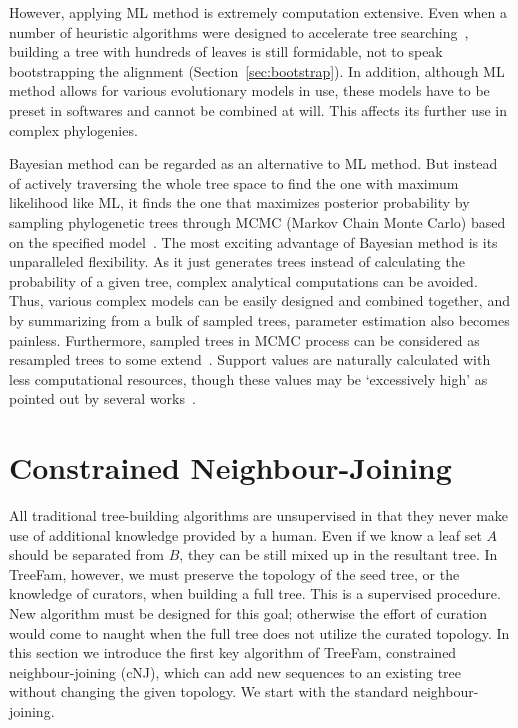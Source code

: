 However, applying ML method is extremely computation extensive. Even when a number of heuristic
algorithms were designed to accelerate tree searching~\cite{olsen94,guindon03,stamatakis05}, building
a tree with hundreds of leaves is still formidable, not to speak
bootstrapping the alignment (Section~\ref{sec:bootstrap}).
In addition, although ML method allows for various evolutionary models in use, these models have to
be preset in softwares and cannot be combined at will. This affects its further use
in complex phylogenies.

Bayesian method can be regarded as an alternative to ML method. But instead of actively traversing the whole
tree space to find the one with maximum likelihood like ML, it finds the one that maximizes posterior probability
by sampling phylogenetic trees through MCMC (Markov Chain Monte Carlo) based on the specified model~\cite{rannala96}.
The most exciting advantage of Bayesian method is its unparalleled flexibility. As
it just generates trees instead of calculating the probability of a given tree, complex analytical computations
can be avoided. Thus, various complex models can be easily designed and combined together, and
by summarizing from a bulk of sampled trees,
parameter estimation also becomes painless. Furthermore, sampled trees in MCMC process
can be considered as resampled trees to some extend~\cite{larget99}. Support values are naturally calculated
with less computational resources, though these values may be `excessively high' as pointed out
by several works~\cite{suzuki02,cummings03,simmons04}.

\section{Constrained Neighbour-Joining} \label{sec:cnj}

All traditional tree-building algorithms are unsupervised in that they never make use of
additional knowledge provided by a human. Even if we know a leaf set $A$ should be
separated from $B$, they can be still mixed up in the resultant tree. In TreeFam,
however, we must preserve the topology of the seed tree, or the knowledge of curators, when building a full tree.
This is a supervised procedure. New algorithm must be designed for this goal; otherwise
the effort of curation would come to naught when the full tree does not utilize
the curated topology. In this section we introduce the first key algorithm of TreeFam,
constrained neighbour-joining (cNJ), which can add new sequences to an existing tree
without changing the given topology. We start with the standard neighbour-joining.

